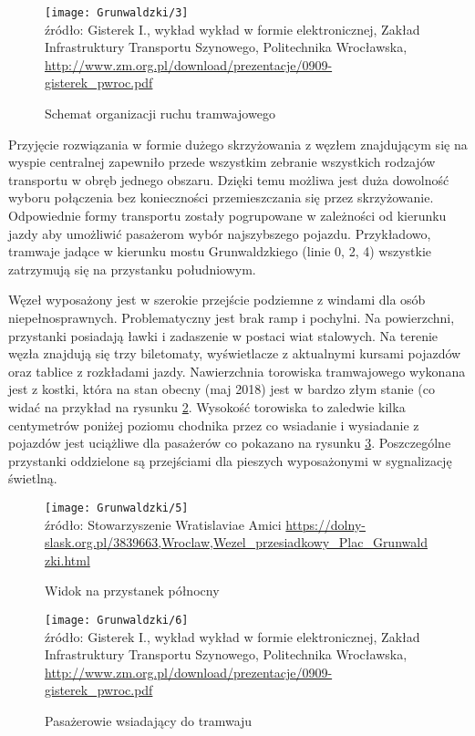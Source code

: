 \documentclass[twoside,12pt]{article}
\begin{document}
	\begin{figure}[H]
		\centering
		\caption{Schemat organizacji ruchu tramwajowego}
		\texttt{[image: Grunwaldzki/3]}\\
		\footnotesize{źródło: Gisterek I., wykład wykład w formie elektronicznej, Zakład Infrastruktury Transportu Szynowego, Politechnika Wrocławska, \url{http://www.zm.org.pl/download/prezentacje/0909-gisterek_pwroc.pdf} \cite{grunwaldzki2}}
		\label{grunwaldzki3}
	\end{figure}	
	
	Przyjęcie rozwiązania w formie dużego skrzyżowania z węzłem znajdującym się na wyspie centralnej zapewniło przede wszystkim zebranie wszystkich rodzajów transportu w obręb jednego obszaru. Dzięki temu możliwa jest duża dowolność wyboru połączenia bez konieczności przemieszczania się przez skrzyżowanie. Odpowiednie formy transportu zostały pogrupowane w zależności od kierunku jazdy aby umożliwić pasażerom wybór najszybszego pojazdu. Przykładowo, tramwaje jadące w kierunku mostu Grunwaldzkiego (linie 0, 2, 4) wszystkie zatrzymują się na przystanku południowym. 
	
	Węzeł wyposażony jest w szerokie przejście podziemne z windami dla osób niepełnosprawnych. Problematyczny jest brak ramp i pochylni. Na powierzchni, przystanki posiadają ławki i zadaszenie w postaci wiat stalowych. Na terenie węzła znajdują się trzy biletomaty, wyświetlacze z aktualnymi kursami pojazdów oraz tablice z rozkładami jazdy. Nawierzchnia torowiska tramwajowego wykonana jest z kostki, która na stan obecny (maj 2018) jest w bardzo złym stanie (co widać na przykład na rysunku \ref{grunwaldzki5}. Wysokość torowiska to zaledwie kilka centymetrów poniżej poziomu chodnika przez co wsiadanie i wysiadanie z pojazdów jest uciążliwe dla pasażerów co pokazano na rysunku \ref{grunwaldzki6}. Poszczególne przystanki oddzielone są przejściami dla pieszych wyposażonymi w sygnalizację świetlną. 
	
	\begin{figure}[H]
		\centering
		\caption{Widok na przystanek północny}
		\texttt{[image: Grunwaldzki/5]}\\
		\footnotesize{źródło: Stowarzyszenie Wratislaviae Amici \url{https://dolny-slask.org.pl/3839663,Wroclaw,Wezel_przesiadkowy_Plac_Grunwaldzki.html}}
		\label{grunwaldzki5}
	\end{figure}	
	
		\begin{figure}[H]
		\centering
		\caption{Pasażerowie wsiadający do tramwaju}
		\texttt{[image: Grunwaldzki/6]}\\
		\footnotesize{źródło: Gisterek I., wykład wykład w formie elektronicznej, Zakład Infrastruktury Transportu Szynowego, Politechnika Wrocławska, \url{http://www.zm.org.pl/download/prezentacje/0909-gisterek_pwroc.pdf} \cite{grunwaldzki2}}
		\label{grunwaldzki6}
	\end{figure}	
	
\end{document}
